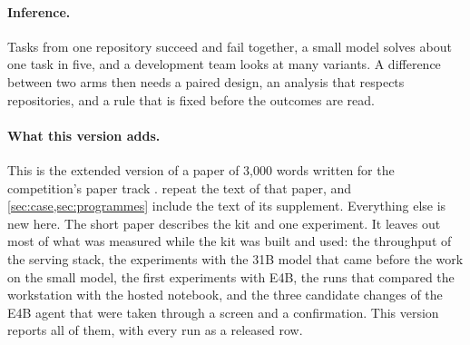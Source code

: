\paragraph{Inference.} Tasks from one repository succeed and fail together, a small model solves about one task in
five, and a development team looks at many variants. A difference between two arms then needs a paired design, an
analysis that respects repositories, and a rule that is fixed before the outcomes are read.

\paragraph{What this version adds.} This is the extended version of a paper of 3,000 words written for the
competition's paper track \citep{markowitz2026papertrack}. 
repeat the text of that paper, and \cref{sec:case,sec:programmes} include the text of its supplement. Everything else is
new here. The short paper describes the kit and one experiment. It leaves out most of what was measured while the kit
was built and used: the throughput of the serving stack, the experiments with the 31B model that came before the work
on the small model, the first experiments with E4B, the runs that compared the workstation with the hosted notebook,
and the three candidate changes of the E4B agent that were taken through a screen and a confirmation. This version
reports all of them, with every run as a released row.

